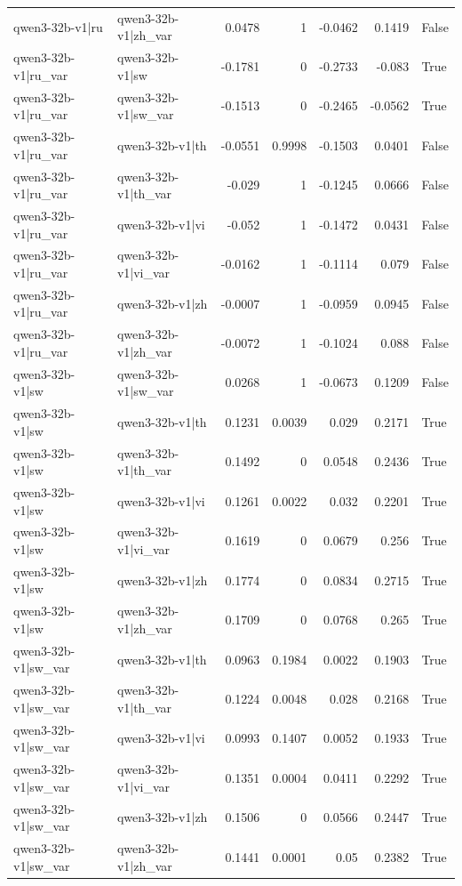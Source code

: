 \begin{table}
\begin{tabular}{l l r r r r l}
qwen3-32b-v1|ru & qwen3-32b-v1|zh_var & 0.0478 & 1 & -0.0462 & 0.1419 & False \\
qwen3-32b-v1|ru_var & qwen3-32b-v1|sw & -0.1781 & 0 & -0.2733 & -0.083 & True \\
qwen3-32b-v1|ru_var & qwen3-32b-v1|sw_var & -0.1513 & 0 & -0.2465 & -0.0562 & True \\
qwen3-32b-v1|ru_var & qwen3-32b-v1|th & -0.0551 & 0.9998 & -0.1503 & 0.0401 & False \\
qwen3-32b-v1|ru_var & qwen3-32b-v1|th_var & -0.029 & 1 & -0.1245 & 0.0666 & False \\
qwen3-32b-v1|ru_var & qwen3-32b-v1|vi & -0.052 & 1 & -0.1472 & 0.0431 & False \\
qwen3-32b-v1|ru_var & qwen3-32b-v1|vi_var & -0.0162 & 1 & -0.1114 & 0.079 & False \\
qwen3-32b-v1|ru_var & qwen3-32b-v1|zh & -0.0007 & 1 & -0.0959 & 0.0945 & False \\
qwen3-32b-v1|ru_var & qwen3-32b-v1|zh_var & -0.0072 & 1 & -0.1024 & 0.088 & False \\
qwen3-32b-v1|sw & qwen3-32b-v1|sw_var & 0.0268 & 1 & -0.0673 & 0.1209 & False \\
qwen3-32b-v1|sw & qwen3-32b-v1|th & 0.1231 & 0.0039 & 0.029 & 0.2171 & True \\
qwen3-32b-v1|sw & qwen3-32b-v1|th_var & 0.1492 & 0 & 0.0548 & 0.2436 & True \\
qwen3-32b-v1|sw & qwen3-32b-v1|vi & 0.1261 & 0.0022 & 0.032 & 0.2201 & True \\
qwen3-32b-v1|sw & qwen3-32b-v1|vi_var & 0.1619 & 0 & 0.0679 & 0.256 & True \\
qwen3-32b-v1|sw & qwen3-32b-v1|zh & 0.1774 & 0 & 0.0834 & 0.2715 & True \\
qwen3-32b-v1|sw & qwen3-32b-v1|zh_var & 0.1709 & 0 & 0.0768 & 0.265 & True \\
qwen3-32b-v1|sw_var & qwen3-32b-v1|th & 0.0963 & 0.1984 & 0.0022 & 0.1903 & True \\
qwen3-32b-v1|sw_var & qwen3-32b-v1|th_var & 0.1224 & 0.0048 & 0.028 & 0.2168 & True \\
qwen3-32b-v1|sw_var & qwen3-32b-v1|vi & 0.0993 & 0.1407 & 0.0052 & 0.1933 & True \\
qwen3-32b-v1|sw_var & qwen3-32b-v1|vi_var & 0.1351 & 0.0004 & 0.0411 & 0.2292 & True \\
qwen3-32b-v1|sw_var & qwen3-32b-v1|zh & 0.1506 & 0 & 0.0566 & 0.2447 & True \\
qwen3-32b-v1|sw_var & qwen3-32b-v1|zh_var & 0.1441 & 0.0001 & 0.05 & 0.2382 & True \\

\end{tabular}
\end{table}
